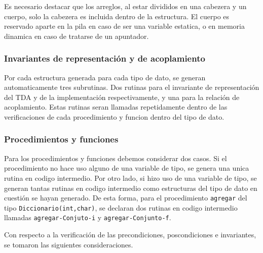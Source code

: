 Es necesario destacar que los arreglos, al estar divididos en una cabezera y
un cuerpo, solo la cabezera es incluida dentro de la estructura. El cuerpo es
reservado aparte en la pila en caso de ser una variable estatica, o en memoria
dinamica en caso de tratarse de un apuntador.

\subsubsection{Invariantes de representación y de acoplamiento}
Por cada estructura generada para cada tipo de dato, se generan
automaticamente tres subrutinas. Dos rutinas para el invariante de
representación del TDA y de la implementación respectivamente, y una para la
relación de acoplamiento. Estas rutinas seran llamadas repetidamente dentro de
las verificaciones de cada procedimiento y funcion dentro del tipo de dato.

\subsubsection{Procedimientos y funciones} Para los procedimientos y funciones
debemos considerar dos casos. Si el procedimiento no hace uso alguno de una
variable de tipo, se genera una unica rutina en codigo intermedio. Por otro
lado, si hizo uso de una variable de tipo, se generan tantas rutinas en codigo
intermedio como estructuras del tipo de dato en cuestión se hayan generado. De
esta forma, para el procedimiento \texttt{agregar} del tipo
\texttt{Diccionario(int,char)}, se declaran dos rutinas en codigo intermedio
llamadas \texttt{agregar-Conjuto-i} y \texttt{agregar-Conjunto-f}.

Con respecto a la verificación de las precondiciones, poscondiciones e
invariantes, se tomaron las siguientes consideraciones.

